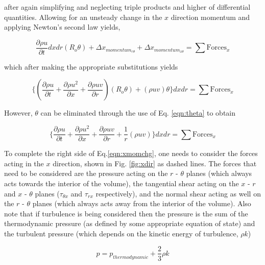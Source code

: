 	after again simplifying and neglecting triple products and higher of differential quantities.  Allowing for an
unsteady change in the $x$ direction momentum and applying Newton's second law yields,

\begin{displaymath}
	\frac{\partial \rho u}{\partial t}dxdr(R_o \theta) + \Delta x_{momentum_{r \theta}} + \Delta x_{momentum_{x \theta}} = 
	\sum \textrm{Forces}_x
\end{displaymath}

	which after making the appropriate substitutions yields

\begin{displaymath}
	\Big\{(\frac{\partial \rho u}{\partial t} + \frac{\partial \rho u^2}{\partial x} +
	\frac{\partial \rho uv}{\partial r})(R_o \theta) + (\rho u v) \theta\Big\}dxdr = \sum \textrm{Forces}_x
\end{displaymath}

	However, $\theta$ can be eliminated through the use of Eq. \ref{eqn:theta} to obtain

\begin{equation}
	\Big\{\frac{\partial \rho u}{\partial t} + \frac{\partial \rho u^2}{\partial x} +
	\frac{\partial \rho uv}{\partial r} + \frac{1}{r}(\rho u v)\Big\}dxdr = \sum \textrm{Forces}_x
\label{eqn:xmomchg}
\end{equation}

	To complete the right side of Eq.\ref{eqn:xmomchg}, one needs to consider the forces acting in the $x$ direction,
shown in Fig. \ref{fig:xdir} as dashed lines.
The forces that need to be considered are the pressure acting on the $r$ - $\theta$ planes 
(which always acts towards the interior of the volume), the tangential shear acting on the $x$ - $r$ and $x$ - $\theta$ 
planes ($\tau_{\theta x}$ and $\tau_{rx}$ respectively),
and the normal shear acting as well on the $r$ - $\theta$ planes (which always acts away from the interior
of the volume).  Also note that if turbulence is being considered then the pressure is the sum of the thermodynamic
pressure (as defined by some appropriate equation of state) and the turbulent pressure (which depends on the kinetic
energy of turbulence, $\rho k$)

\begin{displaymath}
	p = p_{thermodynamic} + \frac{2}{3}\rho k
\end{displaymath}

